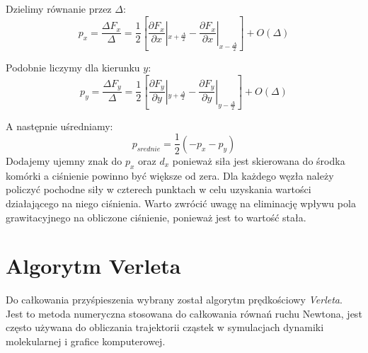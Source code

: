 \documentclass[12pt, letterpaper]{report}
\begin{document}
    Dzielimy równanie przez $\Delta$:
    \begin{equation}
        p_x = \frac{\Delta F_x}{\Delta} = \frac{1}{2} 
        \left[ \frac{\partial F_x}{\partial x} |_{x + \frac{\Delta}{2}} - \frac{\partial F_x}{\partial x} |_{x - \frac{\Delta}{2}} \right] + O(\Delta)
    \end{equation}

    Podobnie liczymy dla kierunku $y$:
    \begin{equation}
        p_y = \frac{\Delta F_y}{\Delta} = \frac{1}{2} 
        \left[ \frac{\partial F_y}{\partial y} |_{y + \frac{\Delta}{2}} - \frac{\partial F_y}{\partial y} |_{y - \frac{\Delta}{2}} \right] + O(\Delta)
    \end{equation}

    A następnie uśredniamy:
    \begin{equation}
        p_{srednie} = \frac{1}{2} \left( -p_x - p_y \right)
    \end{equation}
    Dodajemy ujemny znak do $p_x$ oraz $d_x$ ponieważ siła jest skierowana do środka komórki a 
    ciśnienie powinno być większe od zera. Dla każdego węzła należy policzyć pochodne siły w czterech punktach w celu 
    uzyskania wartości działającego na niego ciśnienia. Warto zwrócić uwagę na eliminację wpływu 
    pola grawitacyjnego na obliczone ciśnienie, ponieważ jest to wartość stała.

    \clearpage
    \section{Algorytm Verleta}
    Do całkowania przyśpieszenia wybrany został algorytm prędkościowy \emph{Verleta}. 
    Jest to metoda numeryczna stosowana do całkowania równań ruchu Newtona,
    jest często używana do obliczania trajektorii cząstek w symulacjach 
    dynamiki molekularnej i grafice komputerowej.
     
\end{document}
